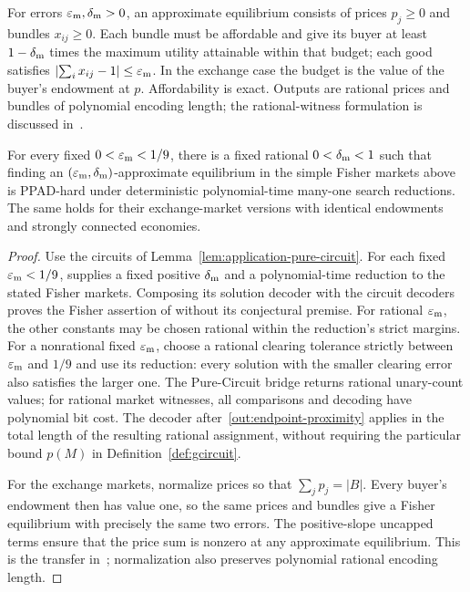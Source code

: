 For errors $\varepsilon_{\rm m},\delta_{\rm m}>0$, an approximate equilibrium
consists of prices $p_j\geq0$ and bundles $x_{ij}\geq0$. Each bundle
must be affordable and give its buyer at least $1-\delta_{\rm m}$
times the maximum utility attainable within that budget; each good
satisfies $\lvert \sum_i x_{ij}-1\rvert\leq\varepsilon_{\rm m}$. In the exchange
case the budget is the value of the buyer's endowment at $p$.
Affordability is exact. Outputs are rational prices and bundles of
polynomial encoding length; the rational-witness formulation is
discussed in~\cite[Section~2.1]{Fisher2026}.

\begin{corollary}
\label{cor:market-hardness}
For every fixed $0<\varepsilon_{\rm m}<1/9$, there is a fixed
rational $0<\delta_{\rm m}<1$ such that finding an
$(\varepsilon_{\rm m},\delta_{\rm m})$-approximate equilibrium in the simple
Fisher markets above is PPAD-hard under deterministic polynomial-time
many-one search reductions. The same holds for their exchange-market
versions with identical endowments and strongly connected economies.
\end{corollary}

\begin{proof}
Use the circuits of Lemma~\ref{lem:application-pure-circuit}.
For each fixed $\varepsilon_{\rm m}<1/9$,
\cite[Proposition~4.4]{Fisher2026} supplies a fixed positive $\delta_{\rm m}$ and a polynomial-time
reduction to the stated Fisher markets. Composing its solution decoder
with the circuit decoders proves the Fisher assertion of
\cite[Theorem~4.1]{Fisher2026} without its conjectural premise.
For rational $\varepsilon_{\rm m}$, the other constants may be chosen rational
within the reduction's strict margins. For a nonrational fixed
$\varepsilon_{\rm m}$, choose a rational clearing tolerance strictly between
$\varepsilon_{\rm m}$ and $1/9$ and use its reduction: every solution with
the smaller clearing error also satisfies the larger one.
The Pure-Circuit bridge returns rational unary-count values;
for rational market witnesses, all comparisons and decoding have
polynomial bit cost. The decoder after~\eqref{out:endpoint-proximity}
applies in the total length of the resulting rational assignment,
without requiring the particular bound $p(M)$ in
Definition~\ref{def:gcircuit}.

For the exchange markets, normalize prices so that
$\sum_jp_j=|B|$. Every buyer's endowment then has value one, so the
same prices and bundles give a Fisher equilibrium with precisely the
same two errors. The positive-slope uncapped terms ensure that the
price sum is nonzero at any approximate equilibrium. This is the
transfer in~\cite[Appendix~B and Theorem~B.1]{Fisher2026}; normalization
also preserves polynomial rational encoding length.
\end{proof}

